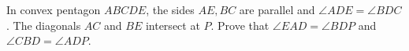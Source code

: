 In convex pentagon $ABCDE$,  the sides $AE,BC$ are parallel and $\angle ADE=\angle BDC$. The diagonals $AC$ and $BE$ intersect at $P$. Prove that $\angle EAD=\angle BDP$ and $\angle CBD=\angle ADP$.